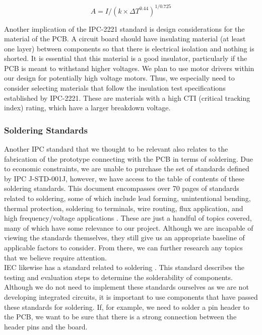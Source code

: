 \noindent \[A = I / ({k \times \Delta T ^ {0.44}}) ^ {1/0.725}\]

\noindent Another implication of the IPC-2221 standard is design considerations for the material of the PCB. A circuit board should have insulating material (at least one layer) between components so that there is electrical isolation and nothing is shorted. It is essential that this material is a good insulator, particularly if the PCB is meant to withstand higher voltages. We plan to use motor drivers within our design for potentially high voltage motors. Thus, we especially need to consider selecting materials that follow the insulation test specifications established by IPC-2221. These are materials with a high CTI (critical tracking index) rating, which have a larger breakdown voltage.\\


\subsubsection{Soldering Standards}
\noindent Another IPC standard that we thought to be relevant also relates to the fabrication of the prototype connecting with the PCB in terms of soldering. Due to economic constraints, we are unable to purchase the set of standards defined by IPC J-STD-001J, however, we have access to the table of contents of these soldering standards. This document encompasses over 70 pages of standards related to soldering, some of which include lead forming, unintentional bending, thermal protection, soldering to terminals, wire routing, flux application, and high frequency/voltage applications \cite{ipc_standard}. These are just a handful of topics covered, many of which have some relevance to our project. Although we are incapable of viewing the standards themselves, they still give us an appropriate baseline of applicable factors to consider. From there, we can further research any topics that we believe require attention.\\

\noindent IEC likewise has a standard related to soldering \cite{iec6006869ed2017}. This standard describes the testing and evaluation steps to determine the solderability of components. Although we do not need to implement these standards ourselves as we are not developing integrated circuits, it is important to use components that have passed these standards for soldering. If, for example, we need to solder a pin header to the PCB, we want to be sure that there is a strong connection between the header pins and the board.

